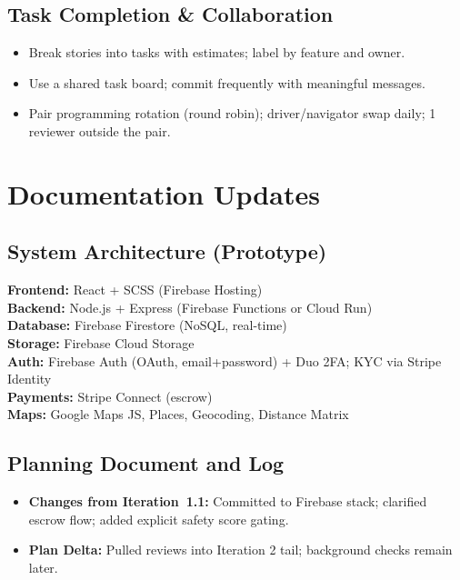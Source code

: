 \documentclass[11pt]{article}
\begin{document}
\subsection{Task Completion \& Collaboration}
\begin{itemize}[leftmargin=1.4em]
  \item Break stories into tasks with estimates; label by feature and owner.
  \item Use a shared task board; commit frequently with meaningful messages.
  \item Pair programming rotation (round robin); driver/navigator swap daily; 1 reviewer outside the pair.
\end{itemize}

\section{Documentation Updates}

\subsection{System Architecture (Prototype)}
\textbf{Frontend:} React + SCSS (Firebase Hosting)\\
\textbf{Backend:} Node.js + Express (Firebase Functions or Cloud Run)\\
\textbf{Database:} Firebase Firestore (NoSQL, real-time)\\
\textbf{Storage:} Firebase Cloud Storage\\
\textbf{Auth:} Firebase Auth (OAuth, email+password) + Duo 2FA; KYC via Stripe Identity\\
\textbf{Payments:} Stripe Connect (escrow)\\
\textbf{Maps:} Google Maps JS, Places, Geocoding, Distance Matrix

\subsection{Planning Document and Log}
\begin{itemize}[leftmargin=1.4em]
  \item \textbf{Changes from Iteration~1.1:} Committed to Firebase stack; clarified escrow flow; added explicit safety score gating.
  \item \textbf{Plan Delta:} Pulled reviews into Iteration 2 tail; background checks remain later.
\end{itemize}
\end{document}
